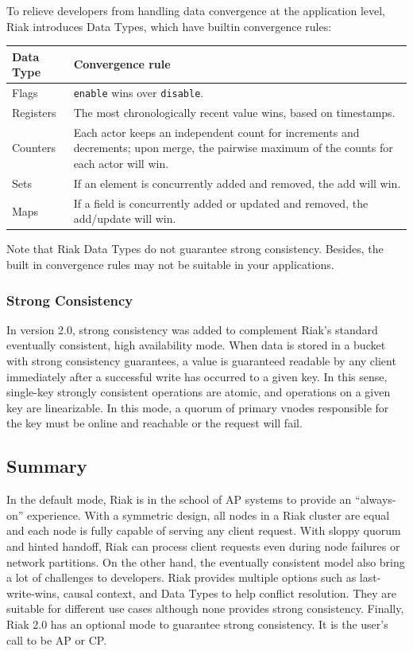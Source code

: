 \documentclass[11pt]{book}
\begin{document}
To relieve developers from handling data convergence at the application level, Riak introduces Data Types, which have builtin convergence rules: 

\begin{center}
\begin{tabular}{ l p{3in} }
\hline
\textbf{Data Type} & \textbf{Convergence rule} \\
\hline
Flags	& \texttt{enable} wins over \texttt{disable}. \\
Registers	& The most chronologically recent value wins, based on timestamps. \\
Counters	& Each actor keeps an independent count for increments and decrements; upon merge, the pairwise maximum of the counts for each actor will win. \\
Sets	        & If an element is concurrently added and removed, the add will win. \\
Maps       & If a field is concurrently added or updated and removed, the add/update will win. \\
\hline
\end{tabular}
\end{center}

Note that Riak Data Types do not guarantee strong consistency. Besides, the built in convergence rules may not be suitable in your applications. 

\subsubsection{Strong Consistency}
In version 2.0, strong consistency was added to complement Riak's standard eventually consistent, high availability mode. When data is stored in a bucket with strong consistency guarantees, a value is guaranteed readable by any client immediately after a successful write has occurred to a given key. In this sense, single-key strongly consistent operations are atomic, and operations on a given key are linearizable. In this mode, a quorum of primary vnodes responsible for the key must be online and reachable or the request will fail.

\subsection{Summary}
In the default mode, Riak is in the school of AP systems to provide an ``always-on'' experience. With a symmetric design, all nodes in a Riak cluster are equal and each node is fully capable of serving any client request. With sloppy quorum and hinted handoff, Riak can process client requests even during node failures or network partitions. On the other hand, the eventually consistent model also bring a lot of challenges to developers. Riak provides multiple options such as last-write-wins, causal context, and Data Types to help conflict resolution. They are suitable for different use cases although none provides strong consistency. Finally, Riak 2.0 has an optional mode to guarantee strong consistency. It is the user's call to be AP or CP.
\end{document}
